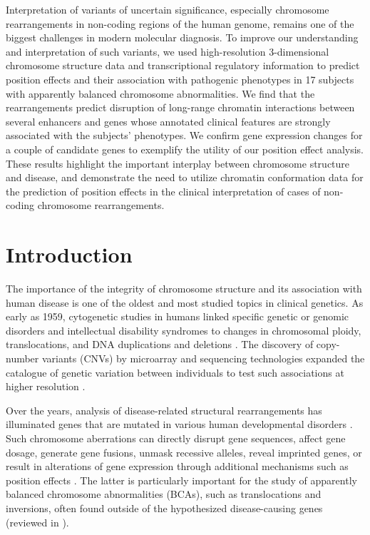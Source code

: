 \documentclass[a4paper,twoside=true,openright,parskip=full,chapterprefix=true,11pt,headings=normal,bibliography=totoc,listof=totoc,titlepage=on,captions=tableabove,draft=false]{scrreprt}
\theoremstyle{definition}
\theoremstyle{definition}
\theoremstyle{definition}
\theoremstyle{remark}
\begin{document}
Interpretation of variants of uncertain significance, especially
chromosome rearrangements in non-coding regions of the human genome,
remains one of the biggest challenges in modern molecular diagnosis. To
improve our understanding and interpretation of such variants, we used
high-resolution 3-dimensional chromosome structure data and
transcriptional regulatory information to predict position effects and
their association with pathogenic phenotypes in 17 subjects with
apparently balanced chromosome abnormalities. We find that the
rearrangements predict disruption of long-range chromatin interactions
between several enhancers and genes whose annotated clinical features
are strongly associated with the subjects' phenotypes. We confirm gene
expression changes for a couple of candidate genes to exemplify the
utility of our position effect analysis. These results highlight the
important interplay between chromosome structure and disease, and
demonstrate the need to utilize chromatin conformation data for the
prediction of position effects in the clinical interpretation of cases
of non-coding chromosome rearrangements.

\hypertarget{introduction-2}{%
\section{Introduction}\label{introduction-2}}

The importance of the integrity of chromosome structure and its
association with human disease is one of the oldest and most studied
topics in clinical genetics. As early as 1959, cytogenetic studies in
humans linked specific genetic or genomic disorders and intellectual
disability syndromes to changes in chromosomal ploidy, translocations,
and DNA duplications and deletions
\citep{Lejeune1959, Ford1959, Jacobs1959, Stankiewicz2002, Iafrate2004}.
The discovery of copy-number variants (CNVs) by microarray and
sequencing technologies expanded the catalogue of genetic variation
between individuals to test such associations at higher resolution
\citep{Iafrate2004, Sebat2004, Hinds2006, Conrad2006, Conrad2010, Korbel2007, Stankiewicz2010, Altshuler2010, Carvalho2016}.

Over the years, analysis of disease-related structural rearrangements
has illuminated genes that are mutated in various human developmental
disorders \citep{Zhang2009, Theisen2010, Nambiar2011, Higgins2008}. Such
chromosome aberrations can directly disrupt gene sequences, affect gene
dosage, generate gene fusions, unmask recessive alleles, reveal
imprinted genes, or result in alterations of gene expression through
additional mechanisms such as position effects \citep{Zhang2009}. The
latter is particularly important for the study of apparently balanced
chromosome abnormalities (BCAs), such as translocations and inversions,
often found outside of the hypothesized disease-causing genes (reviewed
in \citep{Kleinjan2005}).
\end{document}
